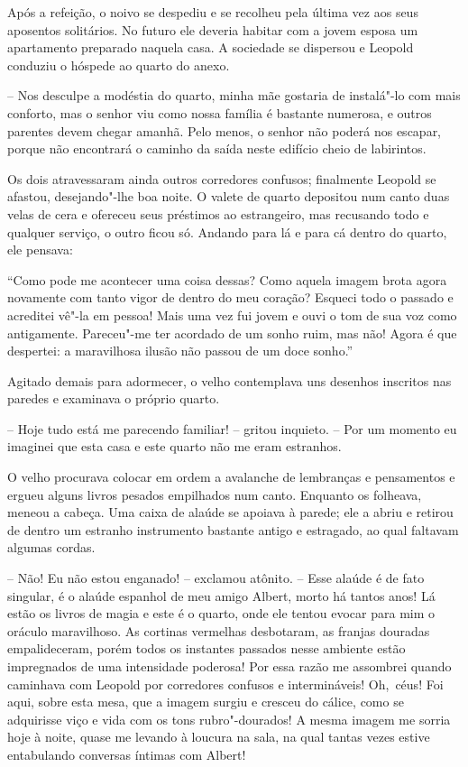 Após a refeição, o noivo se despediu e se recolheu pela última vez aos
seus aposentos solitários. No futuro ele deveria habitar com a jovem
esposa um apartamento preparado naquela casa. A sociedade se dispersou
e Leopold conduziu o hóspede ao quarto do anexo. 

-- Nos desculpe a modéstia do quarto, minha mãe gostaria de
instalá"-lo com mais conforto, mas o senhor viu como nossa família é
bastante numerosa, e outros parentes devem chegar amanhã. Pelo menos, o
senhor não poderá nos escapar, porque não encontrará o caminho da saída
neste edifício cheio de labirintos.

Os dois atravessaram ainda outros corredores confusos; finalmente
Leopold se afastou, desejando"-lhe boa noite. O valete de quarto
depositou num canto duas velas de cera e ofereceu seus préstimos ao
estrangeiro, mas recusando todo e qualquer serviço, o outro ficou só.
Andando para lá e para cá dentro do quarto, ele pensava: 
 
``Como pode me acontecer uma coisa dessas? Como aquela imagem
brota agora novamente com tanto vigor de dentro do meu coração? 
Esqueci todo o passado e acreditei vê"-la em pessoa! Mais uma vez fui
jovem e ouvi o tom de sua voz como antigamente. Pareceu"-me ter 
acordado de um sonho ruim, mas não! Agora é que despertei: a
maravilhosa ilusão não passou de um doce sonho.''

Agitado demais para adormecer, o velho contemplava uns desenhos
inscritos nas paredes e examinava o próprio quarto. 

-- Hoje tudo está me parecendo familiar! -- gritou inquieto. -- Por um
momento eu imaginei que esta casa e este quarto não me eram estranhos. 

O velho procurava colocar em ordem a avalanche de lembranças e
pensamentos e ergueu alguns livros pesados empilhados num canto.
Enquanto os folheava, meneou a cabeça. Uma caixa de alaúde se apoiava à
parede; ele a abriu e retirou de dentro um estranho instrumento
bastante antigo e estragado, ao qual faltavam algumas cordas.

-- Não! Eu não estou enganado! -- exclamou atônito. -- Esse alaúde é de
fato singular, é o alaúde espanhol de meu amigo Albert, morto há tantos
anos! Lá estão os livros de magia e este é o quarto, onde ele tentou
evocar para mim o oráculo maravilhoso. As cortinas vermelhas
desbotaram, as franjas douradas empalideceram, porém todos os instantes
passados nesse ambiente estão impregnados de uma intensidade poderosa!
Por essa razão me assombrei quando caminhava com Leopold por corredores
confusos e intermináveis! \mbox{Oh, céus}! Foi aqui, sobre esta mesa, que a
imagem surgiu e cresceu do cálice, como se adquirisse viço e vida com
os tons rubro"-dourados! A mesma imagem me sorria hoje à noite, quase me
levando à loucura na sala, na qual tantas vezes estive entabulando
conversas íntimas com Albert!

